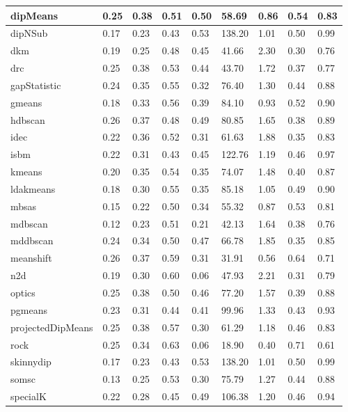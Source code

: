 \begin{table}[H]
\begin{tabular}{|l|l|l|l|l|l|l|l|l|}
\hline
dipMeans & 0.25 & 0.38 & 0.51 & 0.50 & 58.69 & 0.86 & 0.54 & 0.83 \\
\hline
dipNSub & 0.17 & 0.23 & 0.43 & 0.53 & 138.20 & 1.01 & 0.50 & 0.99 \\
\hline
dkm & 0.19 & 0.25 & 0.48 & 0.45 & 41.66 & 2.30 & 0.30 & 0.76 \\
\hline
drc & 0.25 & 0.38 & 0.53 & 0.44 & 43.70 & 1.72 & 0.37 & 0.77 \\
\hline
gapStatistic & 0.24 & 0.35 & 0.55 & 0.32 & 76.40 & 1.30 & 0.44 & 0.88 \\
\hline
gmeans & 0.18 & 0.33 & 0.56 & 0.39 & 84.10 & 0.93 & 0.52 & 0.90 \\
\hline
hdbscan & 0.26 & 0.37 & 0.48 & 0.49 & 80.85 & 1.65 & 0.38 & 0.89 \\
\hline
idec & 0.22 & 0.36 & 0.52 & 0.31 & 61.63 & 1.88 & 0.35 & 0.83 \\
\hline
isbm & 0.22 & 0.31 & 0.43 & 0.45 & 122.76 & 1.19 & 0.46 & 0.97 \\
\hline
kmeans & 0.20 & 0.35 & 0.54 & 0.35 & 74.07 & 1.48 & 0.40 & 0.87 \\
\hline
ldakmeans & 0.18 & 0.30 & 0.55 & 0.35 & 85.18 & 1.05 & 0.49 & 0.90 \\
\hline
mbsas & 0.15 & 0.22 & 0.50 & 0.34 & 55.32 & 0.87 & 0.53 & 0.81 \\
\hline
mdbscan & 0.12 & 0.23 & 0.51 & 0.21 & 42.13 & 1.64 & 0.38 & 0.76 \\
\hline
mddbscan & 0.24 & 0.34 & 0.50 & 0.47 & 66.78 & 1.85 & 0.35 & 0.85 \\
\hline
meanshift & 0.26 & 0.37 & 0.59 & 0.31 & 31.91 & 0.56 & 0.64 & 0.71 \\
\hline
n2d & 0.19 & 0.30 & 0.60 & 0.06 & 47.93 & 2.21 & 0.31 & 0.79 \\
\hline
optics & 0.25 & 0.38 & 0.50 & 0.46 & 77.20 & 1.57 & 0.39 & 0.88 \\
\hline
pgmeans & 0.23 & 0.31 & 0.44 & 0.41 & 99.96 & 1.33 & 0.43 & 0.93 \\
\hline
projectedDipMeans & 0.25 & 0.38 & 0.57 & 0.30 & 61.29 & 1.18 & 0.46 & 0.83 \\
\hline
rock & 0.25 & 0.34 & 0.63 & 0.06 & 18.90 & 0.40 & 0.71 & 0.61 \\
\hline
skinnydip & 0.17 & 0.23 & 0.43 & 0.53 & 138.20 & 1.01 & 0.50 & 0.99 \\
\hline
somsc & 0.13 & 0.25 & 0.53 & 0.30 & 75.79 & 1.27 & 0.44 & 0.88 \\
\hline
specialK & 0.22 & 0.28 & 0.45 & 0.49 & 106.38 & 1.20 & 0.46 & 0.94 \\

\end{tabular}
\end{table}
